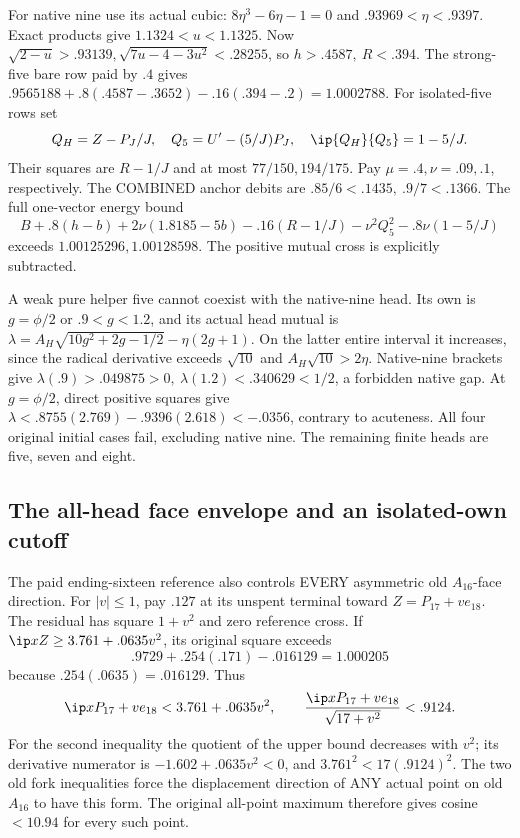 For native nine use its actual cubic:
\(8\eta^3-6\eta-1=0\) and
\(.93969<\eta<.9397\).
Exact products give \(1.1324<u<1.1325\).
Now
\(\sqrt{2-u}>.93139,\sqrt{7u-4-3u^2}<.28255\),
so \(h>.4587,\ R<.394\).
The strong-five bare row paid by \(.4\) gives
\(.9565188+.8(.4587-.3652)-.16(.394-.2)=1.0002788\).
For isolated-five rows set
\[
 Q_H=Z-P_J/J,\quad Q_5=U'-(5/J)P_J,\quad
 \ip{Q_H}{Q_5}=1-5/J .
\]
Their squares are \(R-1/J\) and at most \(77/150,194/175\).
Pay \(\mu=.4,\nu=.09,.1\), respectively.
The COMBINED anchor debits are \(.85/6<.1435,\ .9/7<.1366\).
The full one-vector energy bound
\[
 B+.8(h-b)+2\nu(1.8185-5b)
  -.16(R-1/J)-\nu^2Q_5^2-.8\nu(1-5/J)
\]
exceeds \(1.00125296,1.00128598\).
The positive mutual cross is explicitly subtracted.

A weak pure helper five cannot coexist with the native-nine head.
Its own is \(g=\phi/2\) or \(.9<g<1.2\), and its actual head
mutual is
\(\lambda=A_H\sqrt{10g^2+2g-1/2}-\eta(2g+1)\).
On the latter entire interval it increases, since the radical
derivative exceeds \(\sqrt{10}\) and \(A_H\sqrt{10}>2\eta\).
Native-nine brackets give
\(\lambda(.9)>.049875>0,\ \lambda(1.2)<.340629<1/2\),
a forbidden native gap.
At \(g=\phi/2\), direct positive squares give
\(\lambda<.8755(2.769)-.9396(2.618)<-.0356\),
contrary to acuteness.
All four original initial cases fail, excluding native nine.
The remaining finite heads are five, seven and eight.

\subsection{The all-head face envelope and an isolated-own cutoff}
\label{app:D18faceenvelope}
The paid ending-sixteen reference also controls EVERY asymmetric old
\(A_{16}\)-face direction. For \(|v|\leq1\), pay \(.127\)
at its unspent terminal toward \(Z=P_{17}+ve_{18}\).
The residual has square \(1+v^2\) and zero reference cross.
If \(\ip xZ\geq3.761+.0635v^2\), its original square exceeds
\[
 .9729+.254(.171)-.016129=1.000205
\]
because \(.254(.0635)=.016129\).
Thus
\begin{equation}\label{eq:D18faceenvelope}
 \ip x{P_{17}+ve_{18}}<3.761+.0635v^2,\qquad
 \frac{\ip x{P_{17}+ve_{18}}}{\sqrt{17+v^2}}<.9124 .
\end{equation}
For the second inequality the quotient of the upper bound decreases
with \(v^2\); its derivative numerator is
\(-1.602+.0635v^2<0\), and \(3.761^2<17(.9124)^2\).
The two old fork inequalities force the displacement direction of
ANY actual point on old \(A_{16}\) to have this form.
The original all-point maximum therefore gives cosine \(<10.94\)
for every such point.

